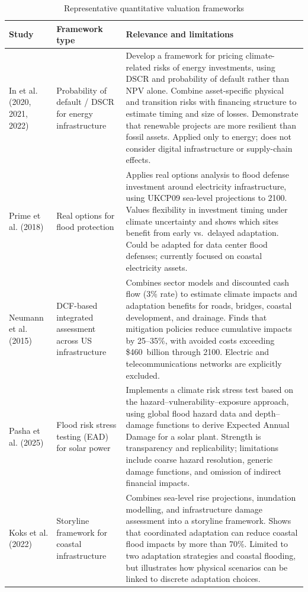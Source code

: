 \begin{table}[H]
\centering
\small
\caption{Representative quantitative valuation frameworks}
\label{tab:app_lit_valuation}
\begin{tabular}{@{}p{3.5cm}p{3.2cm}p{7.0cm}@{}}
\toprule
\textbf{Study} & \textbf{Framework type} & \textbf{Relevance and limitations} \\
\midrule
In et al. (2020, 2021, 2022) &
Probability of default / DSCR for energy infrastructure &
Develop a framework for pricing climate-related risks of energy investments,
using DSCR and probability of default rather than NPV alone. Combine
asset-specific physical and transition risks with financing structure to
estimate timing and size of losses. Demonstrate that renewable projects are
more resilient than fossil assets. Applied only to energy; does not consider
digital infrastructure or supply-chain effects. \\[0.1cm]
Prime et al. (2018) &
Real options for flood protection &
Applies real options analysis to flood defense investment around electricity
infrastructure, using UKCP09 sea-level projections to 2100. Values flexibility
in investment timing under climate uncertainty and shows which sites benefit
from early vs.\ delayed adaptation. Could be adapted for data center flood
defenses; currently focused on coastal electricity assets. \\[0.1cm]
Neumann et al. (2015) &
DCF-based integrated assessment across US infrastructure &
Combines sector models and discounted cash flow (3\% rate) to estimate
climate impacts and adaptation benefits for roads, bridges, coastal
development, and drainage. Finds that mitigation policies reduce cumulative
impacts by 25–35\%, with avoided costs exceeding \$460~billion through 2100.
Electric and telecommunications networks are explicitly excluded. \\[0.1cm]
Pasha et al. (2025) &
Flood risk stress testing (EAD) for solar power &
Implements a climate risk stress test based on the
hazard–vulnerability–exposure approach, using global flood hazard data and
depth–damage functions to derive Expected Annual Damage for a solar plant.
Strength is transparency and replicability; limitations include coarse hazard
resolution, generic damage functions, and omission of indirect financial
impacts. \\[0.1cm]
Koks et al. (2022) &
Storyline framework for coastal infrastructure &
Combines sea-level rise projections, inundation modelling, and infrastructure
damage assessment into a storyline framework. Shows that coordinated
adaptation can reduce coastal flood impacts by more than 70\%. Limited to two
adaptation strategies and coastal flooding, but illustrates how physical
scenarios can be linked to discrete adaptation choices. \\
\bottomrule
\end{tabular}
\end{table}

